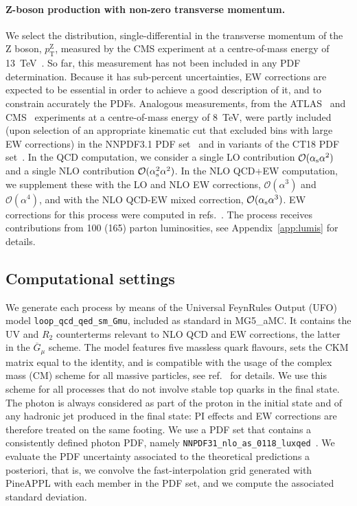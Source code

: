 \paragraph{Z-boson production with non-zero transverse momentum.}
We select the distribution, single-differential in the transverse momentum of
the Z boson, $p_\mathrm{T}^\mathrm{Z}$, measured by the CMS experiment at a centre-of-mass
energy of \SI{13}{\tera\electronvolt}~\cite{Sirunyan:2019bzr}. So far, this measurement has not been
included in any PDF determination. Because it has sub-percent uncertainties,
EW corrections are expected to be essential in order to achieve a good
description of it, and to constrain accurately the PDFs. Analogous measurements,
from the ATLAS~\cite{Aad:2015auj} and CMS~\cite{Khachatryan:2015oaa}
experiments at a centre-of-mass energy of \SI{8}{\tera\electronvolt}, were partly included (upon
selection of an appropriate kinematic cut that excluded bins with large EW
corrections) in the NNPDF3.1 PDF set~\cite{Ball:2017nwa} and in variants of
the CT18 PDF set~\cite{Hou:2019efy}. In the QCD computation, we consider a
single LO contribution $\mathcal{O}(\alpha_\mathrm{s}\alpha^2)$ and a single NLO
contribution $\mathcal{O}(\alpha_\mathrm{s}^2\alpha^2)$. In the NLO QCD+EW computation,
we supplement these with the LO and NLO EW corrections,
$\mathcal{O}(\alpha^3)$ and $\mathcal{O}(\alpha^4)$, and with the NLO
QCD-EW mixed correction, $\mathcal{O}(\alpha_\mathrm{s}\alpha^3)$. EW corrections for
this process were computed in
refs.~\cite{Kuhn:2005az,Denner:2011vu,Hollik:2015pja,Kallweit:2015dum}.
The process receives contributions from 100 (165) parton luminosities,
see Appendix~\ref{app:lumis} for details.

\subsection{Computational settings}
\label{subsec:computational_settings}

We generate each process by means of the Universal FeynRules Output
(UFO)~\cite{Degrande:2011ua} model {\tt loop\_qcd\_qed\_sm\_Gmu},
included as standard in {\sc MG5\_aMC}. It contains the UV and $R_2$
counterterms relevant to NLO QCD and EW corrections, the latter in the
$\overline{G}_\mu$ scheme. The model features five massless quark flavours,
sets the CKM matrix equal to the identity, and is compatible with the usage of
the complex mass (CM) scheme for all massive particles, see
ref.~\cite{Frederix:2018nkq} for details. We use this scheme
for all processes that do not involve stable top quarks in the final state.
The photon is always considered as part of the proton in the initial state and
of any hadronic jet produced in the final state: PI effects and EW corrections
are therefore treated on the same footing. We use a PDF set that contains a
consistently defined photon PDF, namely
{\tt NNPDF31\_nlo\_as\_0118\_luxqed}~\cite{Bertone:2017bme}. We evaluate the PDF
uncertainty associated to the theoretical predictions a posteriori, that is,
we convolve the fast-interpolation grid generated with {\sc PineAPPL} with
each member in the PDF set, and we compute the associated standard deviation.

